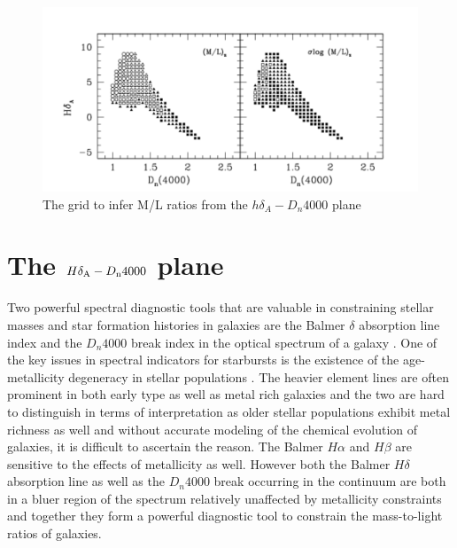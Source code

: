 \begin{figure}
\includegraphics[width=\textwidth]{figures/Kauffmann_grid}
\caption[Short figure name.]{The \citet{kauffmann_stellar_2003} grid to infer M/L ratios from the $h\delta_{A}-D_{n}4000$ plane
\label{fig:kauff_grid}}
\end{figure}

\section{The $H\delta_{\rm A}-D_{\rm n}4000$ plane}

Two powerful spectral diagnostic tools that are valuable in constraining stellar masses and star formation histories in galaxies are the Balmer $\delta$ absorption line index and the $D_{n}4000$ break index in the optical spectrum of a galaxy \citep{kauffmann_stellar_2003}. One of the key issues in spectral indicators for starbursts is the existence of the age-metallicity degeneracy in stellar populations \citep{worthey_comprehensive_1994}. The heavier element lines are often prominent in both early type as well as metal rich galaxies and the two are hard to distinguish in terms of interpretation as older stellar populations exhibit metal richness as well and without accurate modeling of the chemical evolution of galaxies, it is difficult to ascertain the reason. The Balmer $H\alpha$ and $H\beta$ are sensitive to the effects of metallicity as well. However both the Balmer $H\delta$ absorption line as well as the $D_{n}4000$ break occurring in the continuum are both in a bluer region of the spectrum relatively unaffected by metallicity constraints and together they form a powerful diagnostic tool to constrain the mass-to-light ratios of galaxies. 

